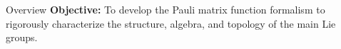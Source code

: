 \begin{frame}{Overview}
    \textbf{Objective:} To develop the Pauli matrix function formalism to rigorously characterize the structure, algebra, and topology of the main Lie groups.
    \vspace{0.5cm}
    \tableofcontents
\end{frame}